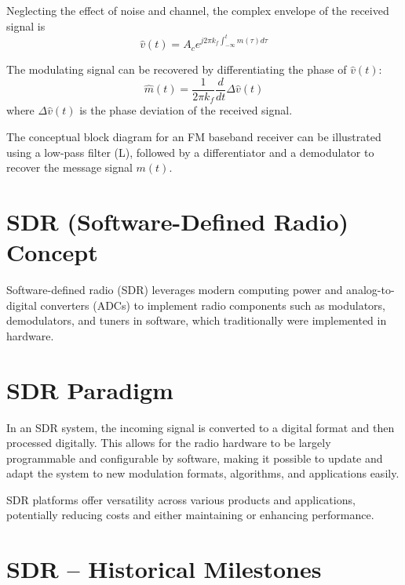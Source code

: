Neglecting the effect of noise and channel, the complex envelope of the received signal is
\[ \hat{v}(t) = A_c e^{j2\pi k_f \int_{-\infty}^{t} m(\tau) d\tau} \]

The modulating signal can be recovered by differentiating the phase of \( \hat{v}(t) \):
\[ \hat{m}(t) = \frac{1}{2\pi k_f} \frac{d}{dt} \Delta \hat{v}(t) \]
where \( \Delta \hat{v}(t) \) is the phase deviation of the received signal.

The conceptual block diagram for an FM baseband receiver can be illustrated using a low-pass filter (L), followed by a differentiator and a demodulator to recover the message signal \( m(t) \).

\section*{SDR (Software-Defined Radio) Concept}

Software-defined radio (SDR) leverages modern computing power and analog-to-digital converters (ADCs) to implement radio components such as modulators, demodulators, and tuners in software, which traditionally were implemented in hardware.

\section*{SDR Paradigm}

In an SDR system, the incoming signal is converted to a digital format and then processed digitally. This allows for the radio hardware to be largely programmable and configurable by software, making it possible to update and adapt the system to new modulation formats, algorithms, and applications easily.

SDR platforms offer versatility across various products and applications, potentially reducing costs and either maintaining or enhancing performance.

\section*{SDR – Historical Milestones}

